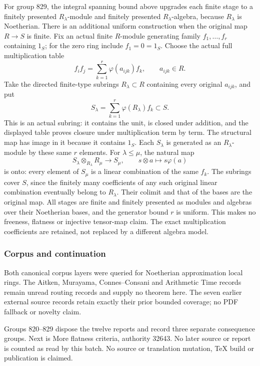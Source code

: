 For group 829, the integral spanning bound above upgrades each finite stage to a finitely presented \(R_\lambda\)-module and finitely presented \(R_\lambda\)-algebra, because \(R_\lambda\) is Noetherian. There is an additional uniform construction when the original map \(R\to S\) is finite. Fix an actual finite \(R\)-module generating family \(f_1,\ldots,f_r\) containing \(1_S\); for the zero ring include \(f_1=0=1_S\). Choose the actual full multiplication table \[
f_if_j=\sum_{k=1}^r\varphi(a_{ijk})f_k,\qquad a_{ijk}\in R.
\] Take the directed finite-type subrings \(R_\lambda\subset R\) containing every original \(a_{ijk}\), and put \[
S_\lambda=\sum_{k=1}^r\varphi(R_\lambda)f_k\subset S.
\] This is an actual subring: it contains the unit, is closed under addition, and the displayed table proves closure under multiplication term by term. The structural map has image in it because it contains \(1_S\). Each \(S_\lambda\) is generated as an \(R_\lambda\)-module by these same \(r\) elements. For \(\lambda\le\mu\), the natural map \[
S_\lambda\otimes_{R_\lambda}R_\mu\to S_\mu,\qquad s\otimes a\mapsto s\varphi(a)
\] is onto: every element of \(S_\mu\) is a linear combination of the same \(f_k\). The subrings cover \(S\), since the finitely many coefficients of any such original linear combination eventually belong to \(R_\lambda\). Their colimit and that of the bases are the original map. All stages are finite and finitely presented as modules and algebras over their Noetherian bases, and the generator bound \(r\) is uniform. This makes no freeness, flatness or injective tensor-map claim. The exact multiplication coefficients are retained, not replaced by a different algebra model.

\subsubsection{Corpus and continuation}\label{corpus-and-continuation}

Both canonical corpus layers were queried for Noetherian approximation local rings. The Aitken, Murayama, Connes--Consani and Arithmetic Time records remain unread routing records and supply no theorem here. The seven earlier external source records retain exactly their prior bounded coverage; no PDF fallback or novelty claim.

Groups 820--829 dispose the twelve reports and record three separate consequence groups. Next is More flatness criteria, authority 32643. No later source or report is counted as read by this batch. No source or translation mutation, TeX build or publication is claimed.

